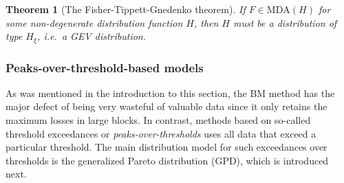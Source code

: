 \documentclass[a4paper,11pt]{article}
\newtheorem{theorem}{Theorem}[section]
\theoremstyle{definition}
\theoremstyle{definition}
\theoremstyle{definition}
\theoremstyle{definition}
\theoremstyle{remark}
\begin{document}
\begin{theorem}[The Fisher-Tippett-Gnedenko theorem]
\protect\hypertarget{thm:gnedenko}{}{\label{thm:gnedenko} {} }
If \(F \in \text{MDA}(H)\) for some non-degenerate distribution function \(H\), then \(H\) must be a distribution of type \(H_{\xi}\), i.e.~a GEV distribution.
\end{theorem}
\hypertarget{peaks-over-threshold-based-models}{%
\subsubsection{Peaks-over-threshold-based models}\label{peaks-over-threshold-based-models}}

As was mentioned in the introduction to this section, the BM method has the major defect of being very wasteful of valuable data since it only retains the maximum losses in large blocks. In contrast, methods based on so-called threshold exceedances or \emph{peaks-over-thresholds} uses all data that exceed a particular threshold. The main distribution model for such exceedances over thresholds is the generalized Pareto distribution (GPD), which is introduced next.
\end{document}

